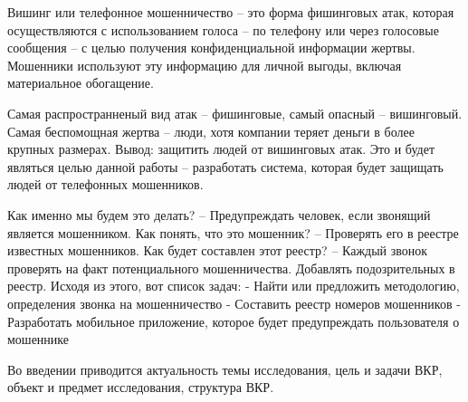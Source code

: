 Вишинг или телефонное мошенничество – это форма фишинговых атак, которая осуществляются с использованием голоса – по телефону или через голосовые сообщения – с целью получения конфиденциальной информации жертвы. Мошенники используют эту информацию для личной выгоды, включая материальное обогащение.

Самая распространненый вид атак – фишинговые, самый опасный – вишинговый.
Самая беспомощная жертва – люди, хотя компании теряет деньги в более крупных размерах.
Вывод: защитить людей от вишинговых атак. Это и будет являться целью данной работы – разработать система, которая будет защищать людей от телефонных мошенников.

Как именно мы будем это делать? – Предупреждать человек, если звонящий является мошенником.
Как понять, что это мошенник? – Проверять его в реестре известных мошенников.
Как будет составлен этот реестр? – Каждый звонок проверять на факт потенциального мошенничества. Добавлять подозрительных в реестр. Исходя из этого, вот список задач:
- Найти или предложить методологию, определения звонка на мошенничество
- Составить реестр номеров мошенников
- Разработать мобильное приложение, которое будет предупреждать пользователя о мошеннике

Во введении приводится актуальность темы исследования, цель и задачи ВКР, объект и предмет исследования, структура ВКР.

\newpage